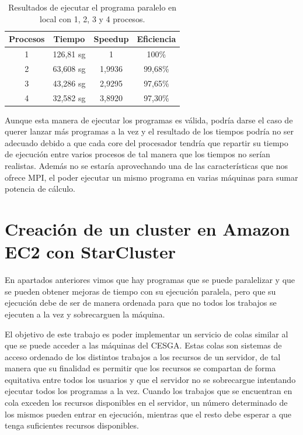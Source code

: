 \documentclass{article}
\begin{document}
\begin{table}[h]
	\begin{center}
		\caption{Resultados de ejecutar el programa paralelo en local con 1, 2, 3 y 4 procesos.}
		\begin{tabular}{|c|c|c|c|}
\hline
\textbf{Procesos} &
\textbf{Tiempo} &
\textbf{Speedup} &
\textbf{Eficiencia} \\ \hline
\hline
1 & 126,81 sg & 1          & 100\% \\ \hline
2 & 63,608 sg & 1,9936 & 99,68\% \\ \hline
3 & 43,286 sg & 2,9295 & 97,65\% \\ \hline
4 & 32,582 sg & 3,8920 & 97,30\% \\ \hline
		\end{tabular}
		\label{tab:resultadosLocal}
	\end{center}
\end{table}

	Aunque esta manera de ejecutar los programas es válida, podría darse el caso de querer lanzar más programas a la vez y el resultado de los tiempos podría no ser adecuado debido a que cada core del procesador tendría que repartir su tiempo de ejecución entre varios procesos de tal manera que los tiempos no serían realistas. Además no se estaría aprovechando una de las características que nos ofrece MPI, el poder ejecutar un mismo programa en varias máquinas para sumar potencia de cálculo.


\clearpage
\section{Creación de un cluster en Amazon EC2 con StarCluster}\label{sec:InstallStarCluster}
	En apartados anteriores vimos que hay programas que se puede paralelizar y que se pueden obtener mejoras de tiempo con su ejecución paralela, pero que su ejecución debe de ser de manera ordenada para que no todos los trabajos se ejecuten a la vez y sobrecarguen la máquina.

	El objetivo de este trabajo es poder implementar un servicio de colas similar al que se puede acceder a las máquinas del CESGA. Estas colas son  sistemas de acceso ordenado de los distintos trabajos a los recursos de un servidor, de tal manera que su finalidad es permitir que los recursos se compartan de forma equitativa entre todos los usuarios y que el servidor no se sobrecargue intentando ejecutar todos los programas a la vez. Cuando los trabajos que se encuentran en cola exceden los recursos disponibles en el servidor, un número determinado de los mismos pueden entrar en ejecución, mientras que el resto debe esperar a que tenga suficientes recursos disponibles.
\end{document}
